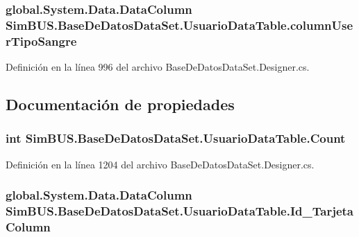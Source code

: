\subsubsection[{column\-User\-Tipo\-Sangre}]{\setlength{\rightskip}{0pt plus 5cm}global.\-System.\-Data.\-Data\-Column Sim\-B\-U\-S.\-Base\-De\-Datos\-Data\-Set.\-Usuario\-Data\-Table.\-column\-User\-Tipo\-Sangre\hspace{0.3cm}{\ttfamily [private]}}\label{class_sim_b_u_s_1_1_base_de_datos_data_set_1_1_usuario_data_table_af68b1cf6b6fa323029fe761ee833b25f}


Definición en la línea 996 del archivo Base\-De\-Datos\-Data\-Set.\-Designer.\-cs.



\subsection{Documentación de propiedades}
\subsubsection[{Count}]{\setlength{\rightskip}{0pt plus 5cm}int Sim\-B\-U\-S.\-Base\-De\-Datos\-Data\-Set.\-Usuario\-Data\-Table.\-Count\hspace{0.3cm}{\ttfamily [get]}}\label{class_sim_b_u_s_1_1_base_de_datos_data_set_1_1_usuario_data_table_a97008e3e0400f8d135fcf6a5f534c6aa}


Definición en la línea 1204 del archivo Base\-De\-Datos\-Data\-Set.\-Designer.\-cs.

\subsubsection[{Id\-\_\-\-Tarjeta\-Column}]{\setlength{\rightskip}{0pt plus 5cm}global.\-System.\-Data.\-Data\-Column Sim\-B\-U\-S.\-Base\-De\-Datos\-Data\-Set.\-Usuario\-Data\-Table.\-Id\-\_\-\-Tarjeta\-Column\hspace{0.3cm}{\ttfamily [get]}}\label{class_sim_b_u_s_1_1_base_de_datos_data_set_1_1_usuario_data_table_a974aa7e41dde0cec846c536984ec58d3}


